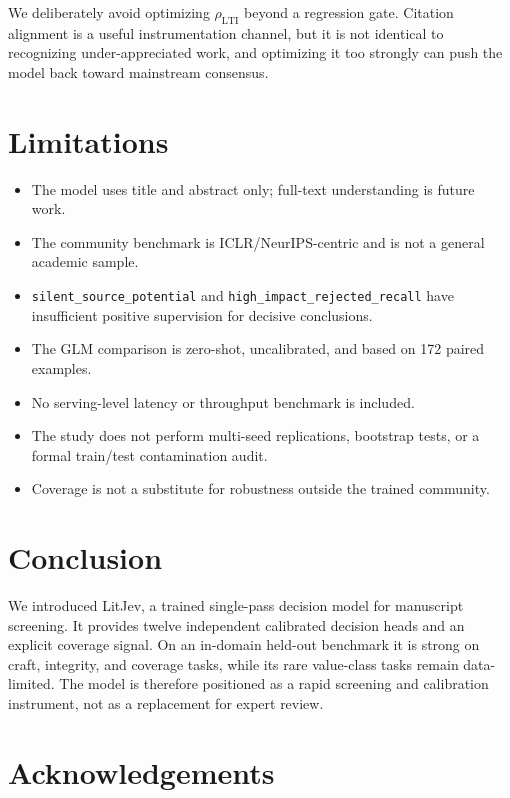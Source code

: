 \documentclass[11pt]{article}
\begin{document}
We deliberately avoid optimizing \(\rho_{\mathrm{LTI}}\) beyond a regression
gate. Citation alignment is a useful instrumentation channel, but it is not
identical to recognizing under-appreciated work, and optimizing it too strongly
can push the model back toward mainstream consensus.

\section{Limitations}

\begin{itemize}
  \item The model uses title and abstract only; full-text understanding is
        future work.
  \item The community benchmark is ICLR/NeurIPS-centric and is not a general
        academic sample.
  \item \texttt{silent\_source\_potential} and
        \texttt{high\_impact\_rejected\_recall} have insufficient positive
        supervision for decisive conclusions.
  \item The GLM comparison is zero-shot, uncalibrated, and based on 172 paired
        examples.
  \item No serving-level latency or throughput benchmark is included.
  \item The study does not perform multi-seed replications, bootstrap tests, or
        a formal train/test contamination audit.
  \item Coverage is not a substitute for robustness outside the trained
        community.
\end{itemize}

\section{Conclusion}

We introduced LitJev, a trained single-pass decision model for manuscript
screening. It provides twelve independent calibrated decision heads and an
explicit coverage signal. On an in-domain held-out benchmark it is strong on
craft, integrity, and coverage tasks, while its rare value-class tasks remain
data-limited. The model is therefore positioned as a rapid screening and
calibration instrument, not as a replacement for expert review.

\section*{Acknowledgements}
\end{document}
